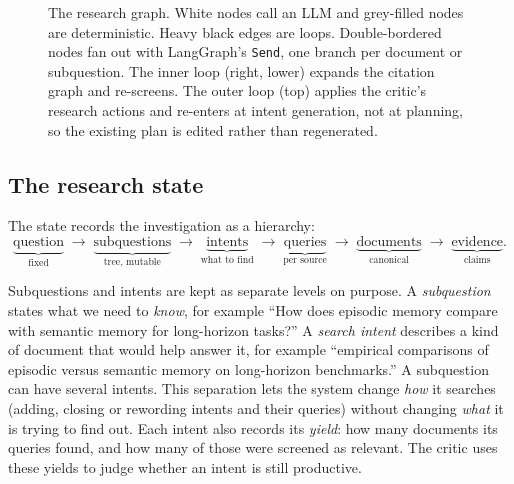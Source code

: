 \documentclass[10pt,a4paper]{article}
\begin{document}
\begin{figure}[t]
{}
\caption{The research graph. White nodes call an LLM and grey-filled nodes are
deterministic. Heavy black edges are loops. Double-bordered nodes fan out with LangGraph's \texttt{Send},
one branch per document or subquestion. The inner loop (right, lower)
expands the citation graph and re-screens. The outer loop (top) applies the
critic's research actions and re-enters at intent generation, not at
planning, so the existing plan is edited rather than regenerated.}
\label{fig:graph}
\end{figure}

\subsection{The research state}
\label{sec:state}

The state records the investigation as a hierarchy:
\[
\underbrace{\text{question}}_{\text{fixed}} \;\to\;
\underbrace{\text{subquestions}}_{\text{tree, mutable}} \;\to\;
\underbrace{\text{intents}}_{\text{what to find}} \;\to\;
\underbrace{\text{queries}}_{\text{per source}} \;\to\;
\underbrace{\text{documents}}_{\text{canonical}} \;\to\;
\underbrace{\text{evidence}}_{\text{claims}} .
\]

Subquestions and intents are kept as separate levels on purpose. A \emph{subquestion} states what we need to \emph{know}, for example ``How does episodic memory compare with semantic memory for long-horizon tasks?'' A \emph{search intent} describes a kind of document that would help answer it, for example ``empirical comparisons of episodic versus semantic memory on long-horizon benchmarks.'' A subquestion can have several intents. This separation lets the system change \emph{how} it searches (adding, closing or rewording intents and their queries) without changing \emph{what} it is trying to find out. Each intent also records its \emph{yield}: how many documents its queries found, and how many of those were screened as relevant. The critic uses these yields to judge whether an intent is still productive.
\end{document}
